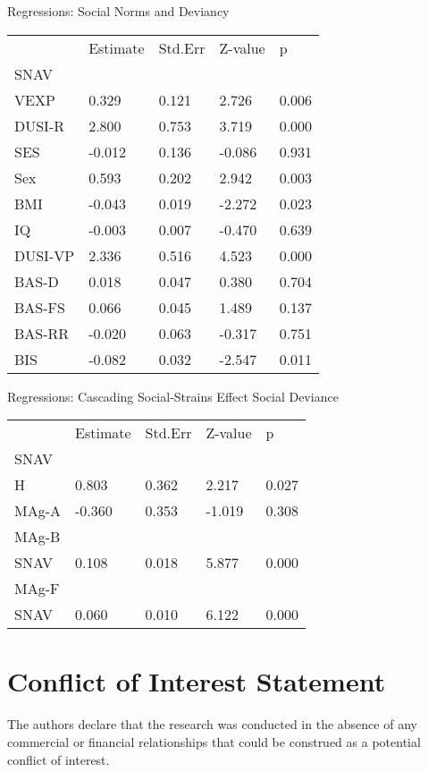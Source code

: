 \documentclass[utf8]{article}
\begin{document}
Regressions: Social Norms and Deviancy
\begin{table}[]
\begin{tabular}{lllll}
        & Estimate & Std.Err & Z-value & p     \\
SNAV    &          &         &         &       \\
VEXP    & 0.329    & 0.121   & 2.726   & 0.006 \\
DUSI-R  & 2.800    & 0.753   & 3.719   & 0.000 \\
SES     & -0.012   & 0.136   & -0.086  & 0.931 \\
Sex     & 0.593    & 0.202   & 2.942   & 0.003 \\
BMI     & -0.043   & 0.019   & -2.272  & 0.023 \\
IQ      & -0.003   & 0.007   & -0.470  & 0.639 \\
DUSI-VP & 2.336    & 0.516   & 4.523   & 0.000 \\
BAS-D   & 0.018    & 0.047   & 0.380   & 0.704 \\
BAS-FS  & 0.066    & 0.045   & 1.489   & 0.137 \\
BAS-RR  & -0.020   & 0.063   & -0.317  & 0.751 \\
BIS     & -0.082   & 0.032   & -2.547  & 0.011
\end{tabular}
\end{table}

Regressions: Cascading Social-Strains Effect Social Deviance
\begin{table}[]
\begin{tabular}{lllll}
      & Estimate & Std.Err & Z-value & p     \\
SNAV  &          &         &         &       \\
H     & 0.803    & 0.362   & 2.217   & 0.027 \\
MAg-A & -0.360   & 0.353   & -1.019  & 0.308 \\
MAg-B &          &         &         &       \\
SNAV  & 0.108    & 0.018   & 5.877   & 0.000 \\
MAg-F &          &         &         &       \\
SNAV  & 0.060    & 0.010   & 6.122   & 0.000
\end{tabular}
\end{table}




\section*{Conflict of Interest Statement}
The authors declare that the research was conducted in the absence of any commercial or financial relationships that could be construed as a potential conflict of interest.
\end{document}
